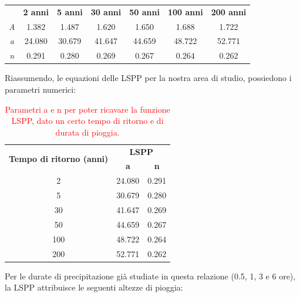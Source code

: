 \begin{table}[H] \centering
    \begin{tabular}{ccccccc}
    \toprule
 & \textbf{2 anni} & \textbf{5 anni} & \textbf{30 anni} & \textbf{50 anni} & \textbf{100 anni} & \textbf{200 anni} \\
    \textit{A} & 1.382  & 1.487  & 1.620  & 1.650  & 1.688  & 1.722  \\
    \textit{a} & 24.080 & 30.679 & 41.647 & 44.659 & 48.722 & 52.771 \\
    \textit{n} & 0.291  & 0.280  & 0.269  & 0.267  & 0.264  & 0.262  \\
    \bottomrule
    \end{tabular}
    \end{table}
Riassumendo, le equazioni delle LSPP per la nostra area di studio, possiedono i parametri numerici:

\begin{table}[H] \centering
    \caption{\textcolor{red}{Parametri a e n per poter ricavare la funzione LSPP, dato un certo tempo di ritorno e di durata di pioggia.}}
    \begin{tabular}{ccc}
    \toprule
    \multirow{2}{*}{\textbf{Tempo di ritorno (anni)}} & \multicolumn{2}{c}{\textbf{LSPP}} \\
     & \textbf{a}      & \textbf{n}      \\
    2                                                 & 24.080          & 0.291           \\
    5                                                 & 30.679          & 0.280           \\
    30                                                & 41.647          & 0.269           \\
    50                                                & 44.659          & 0.267           \\
    100                                               & 48.722          & 0.264           \\
    200                                               & 52.771          & 0.262   \\
    \bottomrule       
    \end{tabular}
    \end{table}

Per le durate di precipitazione già studiate in questa relazione (0.5, 1, 3 e 6 ore), la LSPP attribuisce le seguenti altezze di pioggia:

